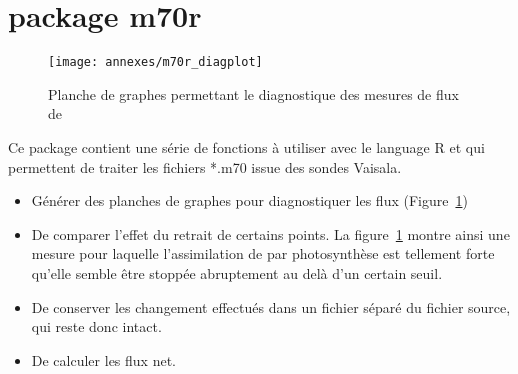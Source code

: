 \section{package m70r}
\label{sec:pckg_m70r}

\begin{figure}
\centering
\texttt{[image: annexes/m70r\_diagplot]}
\caption{Planche de graphes permettant le diagnostique des mesures de flux de \coo}
\label{fig:m70r_diagplot}
\end{figure}

Ce package contient une série de fonctions à utiliser avec le language R et qui permettent de traiter les fichiers *.m70 issue des sondes Vaisala.

\begin{itemize}
\item Générer des planches de graphes pour diagnostiquer les flux (Figure~\ref{fig:m70r_diagplot})
\item De comparer l'effet du retrait de certains points. La figure~\ref{fig:m70r_diagplot} montre ainsi une mesure pour laquelle l'assimilation de \coo par photosynthèse est tellement forte qu'elle semble être stoppée abruptement au delà d'un certain seuil.
\item De conserver les changement effectués dans un fichier séparé du fichier source, qui reste donc intact.
\item De calculer les flux net.
\end{itemize}
